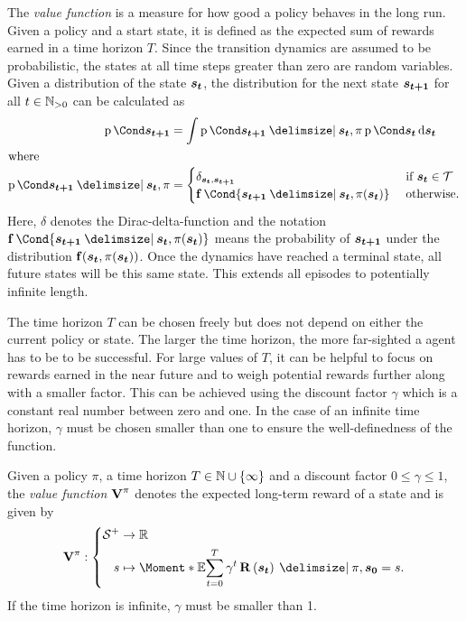 The \emph{value function} is a measure for how good a policy behaves in the long run.
Given a policy and a start state, it is defined as the expected sum of rewards earned in a time horizon $T$.
Since the transition dynamics are assumed to be probabilistic, the states at all time steps greater than zero are random variables.
Given a distribution of the state $\bm{s_t}$, the distribution for the next state $\bm{s_{t+1}}$ for all $t \in \mathbb{N}_{>0}$ can be calculated as
\begin{align}
    \Prob{\rv{s_{t+1}}} &= \int \Prob{\rv{s_{t+1}} \given \rv{s_t}, \pi}\Prob{\rv{s_t}} \diff \rv{s_t} \\
    \intertext{where}
    \Prob{\rv{s_{t+1}} \given \rv{s_t}, \pi} &= \begin{cases}
        \delta_{\rv{s_t}, \rv{s_{t+1}}} & \text{ if $\rv{s_t} \in \Tee$} \\
        \Dyn\Cond{\rv{s_{t+1}} \given \rv{s_t}, \pi(\rv{s_t})} & \text{ otherwise.}
    \end{cases}
\end{align}
Here, $\delta$ denotes the Dirac-delta-function and the notation $\Dyn\Cond{\rv{s_{t+1}} \given \rv{s_t}, \pi(\rv{s_t})}$ means the probability of $\bm{s_{t+1}}$ under the distribution $\Dyn(\rv{s_t}, \pi(\rv{s_t}))$.
Once the dynamics have reached a terminal state, all future states will be this same state.
This extends all episodes to potentially infinite length.

The time horizon $T$ can be chosen freely but does not depend on either the current policy or state.
The larger the time horizon, the more far-sighted a agent has to be to be successful.
For large values of $T$, it can be helpful to focus on rewards earned in the near future and to weigh potential rewards further along with a smaller factor.
This can be achieved using the discount factor $\gamma$ which is a constant real number between zero and one.
In the case of an infinite time horizon, $\gamma$ must be chosen smaller than one to ensure the well-definedness of the function.

\begin{definition}
    Given a policy $\pi$, a time horizon $T \in \mathbb{N} \cup \left\{ \infty \right\}$ and a discount factor $0 \leq \gamma \leq 1$, the \emph{value function $\Vlu^\pi$} denotes the expected long-term reward of a state and is given by
    \begin{align}
        \Vlu^\pi : \left\{
            \begin{aligned}
                \Es^+ &\to \R \\
                s &\mapsto \Moment*{\E}{\sum_{t=0}^T \gamma^t \Rwd \left( \rv{s_t} \right) \given \pi, \rv{s_0} = s }.
            \end{aligned}
        \right.
    \end{align}
    If the time horizon is infinite, $\gamma$ must be smaller than 1.
\end{definition}

